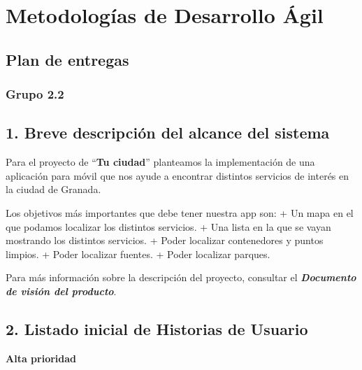 \documentclass[
  a4paper,
,tablecaptionabove
]{scrartcl}
\date{}
\title{}
\author{}
\begin{document}




\hypertarget{metodologuxedas-de-desarrollo-uxe1gil}{%
\section{Metodologías de Desarrollo
Ágil}\label{metodologuxedas-de-desarrollo-uxe1gil}}

\hypertarget{plan-de-entregas}{%
\subsection{Plan de entregas}\label{plan-de-entregas}}

\hypertarget{grupo-2.2}{%
\subsubsection{Grupo 2.2}\label{grupo-2.2}}

\hypertarget{breve-descripciuxf3n-del-alcance-del-sistema}{%
\subsection{1. Breve descripción del alcance del
sistema}\label{breve-descripciuxf3n-del-alcance-del-sistema}}

Para el proyecto de \enquote{\textbf{Tu ciudad}} planteamos la
implementación de una aplicación para móvil que nos ayude a encontrar
distintos servicios de interés en la ciudad de Granada.

Los objetivos más importantes que debe tener nuestra app son: + Un mapa
en el que podamos localizar los distintos servicios. + Una lista en la
que se vayan mostrando los distintos servicios. + Poder localizar
contenedores y puntos limpios. + Poder localizar fuentes. + Poder
localizar parques.

Para más información sobre la descripción del proyecto, consultar el
\textbf{\emph{Documento de visión del producto}}.

\hypertarget{listado-inicial-de-historias-de-usuario}{%
\subsection{2. Listado inicial de Historias de
Usuario}\label{listado-inicial-de-historias-de-usuario}}

\textbf{Alta prioridad}
\end{document}
